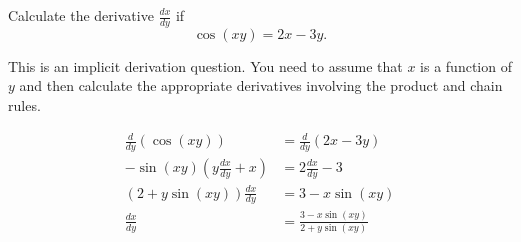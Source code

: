 \documentclass{ximera}
\author{Emma Smith Zbarsky}
\begin{document}
\begin{exercise}

Calculate the derivative $\frac{dx}{dy}$ if \[\cos(xy) = 2x-3y.\]


\begin{hint}
This is an implicit derivation question. You need to assume that $x$ is
a function of $y$ and then calculate the appropriate derivatives
involving the product and chain rules.
\end{hint}


\begin{hint}
\begin{align*}
\frac{d}{dy}\left(\cos(xy)\right) &= \frac{d}{dy}\left(2x-3y\right) \\
-\sin(xy)\left(y\frac{dx}{dy}+x\right) &= 2\frac{dx}{dy}-3 \\
\left(2+y\sin(xy)\right)\frac{dx}{dy} &= 3-x\sin(xy) \\
\frac{dx}{dy} &= \frac{3-x\sin(xy)}{2+y\sin(xy)}
\end{align*}
\end{hint}


\begin{multipleChoice}
\end{multipleChoice}

\end{exercise}
\end{document}

